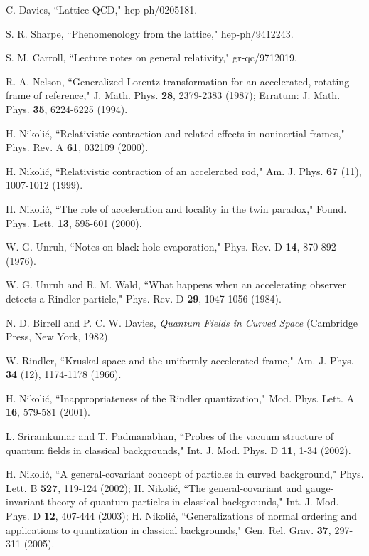 \documentclass[12pt]{article}
\begin{document}
\begin{thebibliography}{99}
C. Davies,
``Lattice QCD,"
hep-ph/0205181.

S. R. Sharpe,
``Phenomenology from the lattice,"
hep-ph/9412243.

S. M. Carroll,
``Lecture notes on general relativity,"
gr-qc/9712019.

R. A. Nelson, 
``Generalized Lorentz transformation for an accelerated, 
rotating frame of reference,"
J. Math. Phys. {\bf 28}, 2379-2383 (1987);
Erratum: J. Math. Phys. {\bf 35}, 6224-6225 (1994).  

H. Nikoli\'c, 
``Relativistic contraction and related effects in noninertial
frames,"
Phys. Rev. A {\bf 61}, 032109 (2000).

H. Nikoli\'c,
``Relativistic contraction of an accelerated rod,"
Am. J. Phys. {\bf 67} (11), 1007-1012 (1999).

H. Nikoli\'c,
``The role of acceleration and locality in the twin paradox,"
Found. Phys. Lett. {\bf 13}, 595-601 (2000).

W. G. Unruh,
``Notes on black-hole evaporation,"
Phys. Rev. D {\bf 14}, 870-892 (1976).

W. G. Unruh and R. M. Wald,
``What happens when an accelerating observer detects a Rindler 
particle,"
Phys. Rev. D {\bf 29}, 1047-1056 (1984). 

N. D. Birrell and P. C. W. Davies, 
{\it Quantum Fields in Curved Space}
(Cambridge Press, New York, 1982). 

W. Rindler,
``Kruskal space and the uniformly accelerated frame,"
Am. J. Phys. {\bf 34} (12), 1174-1178 (1966).

H. Nikoli\'c,
``Inappropriateness of the Rindler quantization,"
Mod. Phys. Lett. A {\bf 16}, 579-581 (2001).

L. Sriramkumar and T. Padmanabhan,
``Probes of the vacuum structure of quantum fields in classical
backgrounds,"
Int. J. Mod. Phys. D {\bf 11}, 1-34 (2002).

H. Nikoli\'c,
``A general-covariant concept of particles in curved background,"
Phys. Lett. B {\bf 527}, 119-124 (2002);
H. Nikoli\'c,
``The general-covariant and gauge-invariant theory of quantum particles in
classical backgrounds,"
Int. J. Mod. Phys. D {\bf 12}, 407-444 (2003);
H. Nikoli\'c,
``Generalizations of normal ordering and applications to quantization in
classical backgrounds,"
Gen. Rel. Grav. {\bf 37}, 297-311 (2005).


\end{thebibliography}
\end{document}
